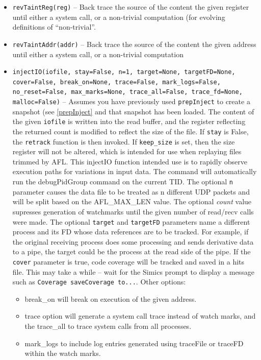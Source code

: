 \documentclass[titlepage]{article}
\begin{document}
\begin{itemize}
\item {\tt revTaintReg(reg)} – Back trace the source of the content the given register until either a system call, or a non-trivial computation (for evolving definitions of “non-trivial”.  

\item {\tt revTaintAddr(addr)} -- Back trace the source of the content the given address until either a system call, or a non-trivial computation

\item {\tt injectIO(iofile, stay=False, n=1, target=None, targetFD=None, cover=False, break\_on=None, trace=False, mark\_logs=False, no\_reset=False, max\_marks=None, trace\_all=False, trace\_fd=None, malloc=False)} -- Assumes you have previously used {\tt prepInject}
to create a snapshot (see \ref{prepInject} and that snapshot has been loaded.
The content of the given {\tt iofile} is written into the read buffer, and the register reflecting 
the returned count is modified to reflect the size of the file.  If {\tt stay} is False, the {\tt retrack} function is then invoked. If {\tt keep\_size} is
set, then the size register will not be altered, which is intended for use when replaying files trimmed by AFL.
This injectIO function intended use is to rapidly observe execution paths for variations in input data. The command will automatically
run the debugPidGroup command on the current TID. The optional {\tt n} parameter causes the data file to be treated as n different UDP packets and will be split
based on the AFL\_MAX\_LEN value.  The optional \textit{count} value supresses generation of watchmarks until the given number of read/recv calls were made.
The optional {\tt target} and {\tt targetFD} parameters name a different process and its FD whose data references are to be tracked.  For example,
if the original receiving process does some processing and sends derivative data to a pipe, the target could be the process at the read side
of the pipe.  If the {\tt cover} parameter is true, code coverage will be tracked and saved in a hits file.  This may take a while -- wait for the
Simics prompt to display a message such as {\tt Coverage saveCoverage to...}.
Other options:
\begin{itemize}
\item break\_on will break on execution of the given address. 
\item trace option will generate a system call trace instead of watch marks, and the trace\_all to trace system calls from all processes. 
\item mark\_logs to include log entries generated using traceFile or traceFD within the watch marks.

\end{itemize}
\end{itemize}
\end{document}
